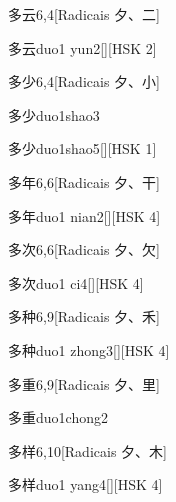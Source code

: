 \begin{entry}{多云}{6,4}[Radicais ⼣、⼆]
  \begin{phonetics}{多云}{duo1 yun2}[][HSK 2]
  \end{phonetics}
\end{entry}

\begin{entry}{多少}{6,4}[Radicais ⼣、⼩]
  \begin{phonetics}{多少}{duo1shao3}
  \end{phonetics}
  \begin{phonetics}{多少}{duo1shao5}[][HSK 1]
  \end{phonetics}
\end{entry}

\begin{entry}{多年}{6,6}[Radicais ⼣、⼲]
  \begin{phonetics}{多年}{duo1 nian2}[][HSK 4]
  \end{phonetics}
\end{entry}

\begin{entry}{多次}{6,6}[Radicais ⼣、⽋]
  \begin{phonetics}{多次}{duo1 ci4}[][HSK 4]
  \end{phonetics}
\end{entry}

\begin{entry}{多种}{6,9}[Radicais ⼣、⽲]
  \begin{phonetics}{多种}{duo1 zhong3}[][HSK 4]
  \end{phonetics}
\end{entry}

\begin{entry}{多重}{6,9}[Radicais ⼣、⾥]
  \begin{phonetics}{多重}{duo1chong2}
  \end{phonetics}
\end{entry}

\begin{entry}{多样}{6,10}[Radicais ⼣、⽊]
  \begin{phonetics}{多样}{duo1 yang4}[][HSK 4]
  \end{phonetics}
\end{entry}

